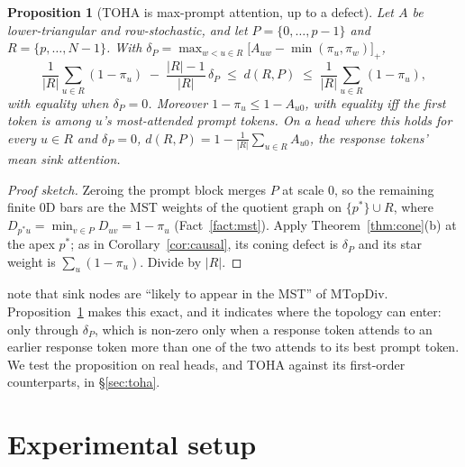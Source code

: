 \documentclass{article}
\newtheorem{proposition}{Proposition}
\theoremstyle{definition}
\newcommand{\defect}{\delta}
\begin{document}
\begin{proposition}[TOHA is max-prompt attention, up to a defect]
\label{prop:toha}
Let $A$ be lower-triangular and row-stochastic, and let $P=\{0,\dots,p-1\}$ and $R=\{p,\dots,N-1\}$. With $\defect_P=\max_{w<u\in R}\big[A_{uw}-\min(\pi_u,\pi_w)\big]_+$,
\[
\frac1{|R|}\sum_{u\in R}(1-\pi_u)\;-\;\frac{|R|-1}{|R|}\,\defect_P\;\le\; d(R,P)\;\le\;\frac1{|R|}\sum_{u\in R}(1-\pi_u),
\]
with equality when $\defect_P=0$. Moreover $1-\pi_u\le 1-A_{u0}$, with equality iff the first token is among $u$'s most-attended prompt tokens. On a head where this holds for every $u\in R$ and $\defect_P=0$, $d(R,P)=1-\frac1{|R|}\sum_{u\in R}A_{u0}$, the response tokens' mean sink attention.
\end{proposition}
\begin{proof}[Proof sketch]
Zeroing the prompt block merges $P$ at scale $0$, so the remaining finite $0$D bars are the MST weights of the quotient graph on $\{p^*\}\cup R$, where $D_{p^*u}=\min_{v\in P}D_{uv}=1-\pi_u$ (Fact~\ref{fact:mst}). Apply Theorem~\ref{thm:cone}(b) at the apex $p^*$; as in Corollary~\ref{cor:causal}, its coning defect is $\defect_P$ and its star weight is $\sum_u(1-\pi_u)$. Divide by $|R|$.
\end{proof}
\noindent \citet{binkowski2026sinkprobe} note that sink nodes are ``likely to appear in the MST'' of $\mathrm{MTopDiv}$. Proposition~\ref{prop:toha} makes this exact, and it indicates where the topology can enter: only through $\defect_P$, which is non-zero only when a response token attends to an earlier response token more than one of the two attends to its best prompt token. We test the proposition on real heads, and TOHA against its first-order counterparts, in \S\ref{sec:toha}.

\section{Experimental setup}
\label{sec:setup}
\end{document}

